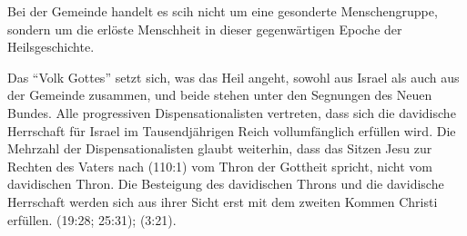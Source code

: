 \documentclass{../../inc/mybib}
\begin{document}
\begin{enumerate}
    Bei der Gemeinde handelt es scih nicht um eine gesonderte Menschengruppe, sondern um die erlöste Menschheit in dieser gegenwärtigen Epoche der Heilsgeschichte. 
    
    Das \enquote{Volk Gottes} setzt sich, was das Heil angeht, sowohl aus Israel als auch aus der Gemeinde zusammen, und beide stehen unter den Segnungen des Neuen Bundes. Alle progressiven Dispensationalisten vertreten, dass sich die davidische Herrschaft für Israel im Tausendjährigen Reich vollumfänglich erfüllen wird. Die Mehrzahl der Dispensationalisten glaubt weiterhin, dass das Sitzen Jesu zur Rechten des Vaters nach (110:1) vom Thron der Gottheit spricht, nicht vom davidischen Thron. Die Besteigung des davidischen Throns und die davidische Herrschaft werden sich aus ihrer Sicht erst mit dem zweiten Kommen Christi erfüllen. (19:28; 25:31); (3:21).
\end{enumerate}
\end{document}

